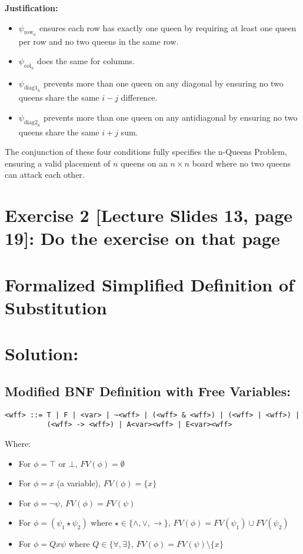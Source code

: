 \documentclass{article}
\begin{document}
\textbf{Justification:}
\begin{itemize}
    \item $\psi_{\text{row}_n}$ ensures each row has exactly one queen by requiring at least one queen per row and no two queens in the same row.
    \item $\psi_{\text{col}_n}$ does the same for columns.
    \item $\psi_{\text{diag1}_n}$ prevents more than one queen on any diagonal by ensuring no two queens share the same $i-j$ difference.
    \item $\psi_{\text{diag2}_n}$ prevents more than one queen on any antidiagonal by ensuring no two queens share the same $i+j$ sum.
\end{itemize}

The conjunction of these four conditions fully specifies the n-Queens Problem, ensuring a valid placement of $n$ queens on an $n \times n$ board where no two queens can attack each other.

\newpage

\section*{Exercise 2 [Lecture Slides 13, page 19]: Do the exercise on that page}

\section*{Formalized Simplified Definition of Substitution}
\section*{Solution:}

\subsection*{Modified BNF Definition with Free Variables:}

\begin{verbatim}
<wff> ::= T | F | <var> | ~<wff> | (<wff> & <wff>) | (<wff> | <wff>) | 
          (<wff> -> <wff>) | A<var><wff> | E<var><wff>
\end{verbatim}

Where:
\begin{itemize}
    \item For $\phi = \top$ or $\bot$, $FV(\phi) = \emptyset$
    \item For $\phi = x$ (a variable), $FV(\phi) = \{x\}$
    \item For $\phi = \neg\psi$, $FV(\phi) = FV(\psi)$
    \item For $\phi = (\psi_1 \star \psi_2)$ where $\star \in \{\wedge, \vee, \rightarrow\}$, $FV(\phi) = FV(\psi_1) \cup FV(\psi_2)$
    \item For $\phi = Qx \psi$ where $Q \in \{\forall, \exists\}$, $FV(\phi) = FV(\psi) \setminus \{x\}$
\end{itemize}
\end{document}
